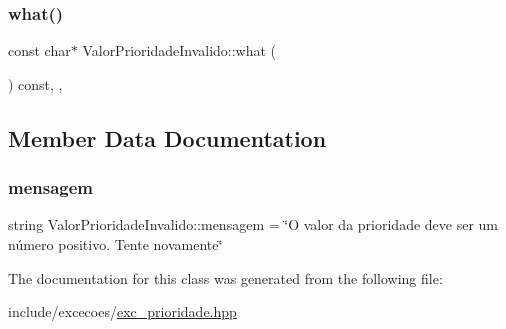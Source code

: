 \subsubsection{\texorpdfstring{what()}{what()}}
{\footnotesize\ttfamily const char$\ast$ Valor\+Prioridade\+Invalido\+::what (\begin{DoxyParamCaption}{ }\end{DoxyParamCaption}) const\hspace{0.3cm}{\ttfamily [inline]}, {\ttfamily [override]}, {\ttfamily [noexcept]}}



\subsection{Member Data Documentation}
\mbox{\label{classValorPrioridadeInvalido_af0cc68ad2ec7183808dc1a222a5cfa98}} 
\subsubsection{\texorpdfstring{mensagem}{mensagem}}
{\footnotesize\ttfamily string Valor\+Prioridade\+Invalido\+::mensagem = \char`\"{}O valor da prioridade deve ser um número positivo. Tente novamente\char`\"{}\hspace{0.3cm}{\ttfamily [private]}}



The documentation for this class was generated from the following file\+:\begin{DoxyCompactItemize}
\item 
include/excecoes/\hyperlink{exc__prioridade_8hpp}{exc\+\_\+prioridade.\+hpp}\end{DoxyCompactItemize}
